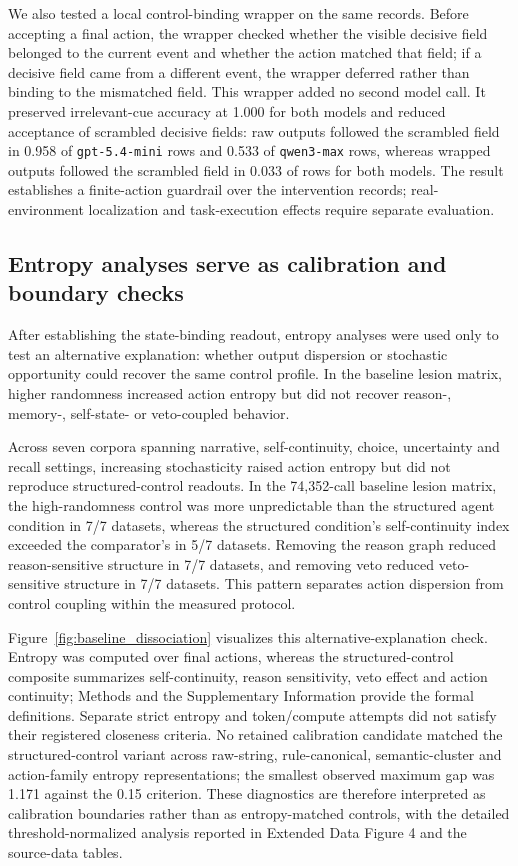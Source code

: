 ﻿\documentclass[preprint,12pt,authoryear]{elsarticle}
\begin{document}
We also tested a local control-binding wrapper on the same records. Before accepting a final action, the wrapper checked whether the visible decisive field belonged to the current event and whether the action matched that field; if a decisive field came from a different event, the wrapper deferred rather than binding to the mismatched field. This wrapper added no second model call. It preserved irrelevant-cue accuracy at 1.000 for both models and reduced acceptance of scrambled decisive fields: raw outputs followed the scrambled field in 0.958 of \texttt{gpt-5.4-mini} rows and 0.533 of \texttt{qwen3-max} rows, whereas wrapped outputs followed the scrambled field in 0.033 of rows for both models. The result establishes a finite-action guardrail over the intervention records; real-environment localization and task-execution effects require separate evaluation.

\subsection{Entropy analyses serve as calibration and boundary checks}

After establishing the state-binding readout, entropy analyses were used only to test an alternative explanation: whether output dispersion or stochastic opportunity could recover the same control profile. In the baseline lesion matrix, higher randomness increased action entropy but did not recover reason-, memory-, self-state- or veto-coupled behavior.

Across seven corpora spanning narrative, self-continuity, choice, uncertainty and recall settings, increasing stochasticity raised action entropy but did not reproduce structured-control readouts. In the 74,352-call baseline lesion matrix, the high-randomness control was more unpredictable than the structured agent condition in 7/7 datasets, whereas the structured condition's self-continuity index exceeded the comparator's in 5/7 datasets. Removing the reason graph reduced reason-sensitive structure in 7/7 datasets, and removing veto reduced veto-sensitive structure in 7/7 datasets. This pattern separates action dispersion from control coupling within the measured protocol.

Figure~\ref{fig:baseline_dissociation} visualizes this alternative-explanation check. Entropy was computed over final actions, whereas the structured-control composite summarizes self-continuity, reason sensitivity, veto effect and action continuity; Methods and the Supplementary Information provide the formal definitions. Separate strict entropy and token/compute attempts did not satisfy their registered closeness criteria. No retained calibration candidate matched the structured-control variant across raw-string, rule-canonical, semantic-cluster and action-family entropy representations; the smallest observed maximum gap was 1.171 against the 0.15 criterion. These diagnostics are therefore interpreted as calibration boundaries rather than as entropy-matched controls, with the detailed threshold-normalized analysis reported in Extended Data Figure 4 and the source-data tables.
\end{document}
